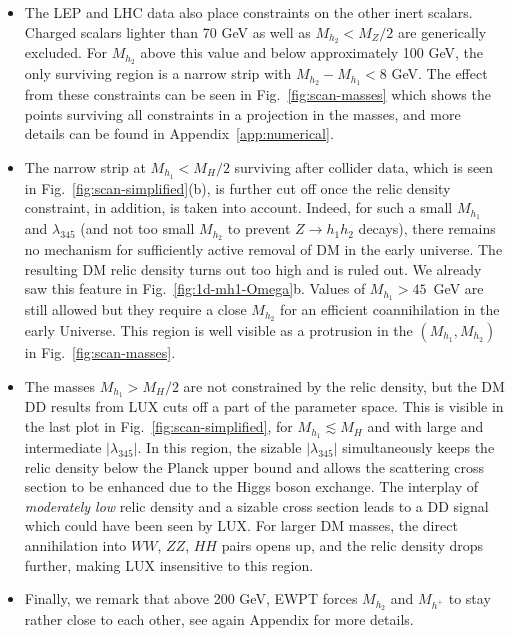 \documentclass[12pt,a4paper]{article}
\begin{document}
\begin{itemize}
\item 
The LEP and LHC data also place constraints on the other inert scalars. 
Charged scalars lighter than 70 GeV as well as $M_{h_2} < M_Z/2$ are generically excluded. 
For $M_{h_2}$ above this value and below approximately 100 GeV, 
the only surviving region is a narrow strip with $M_{h_2} - M_{h_1} < 8$ GeV.
The effect from these constraints can be seen in Fig.~\ref{fig:scan-masses} which shows the points surviving all constraints in a projection in the masses, and more details can be found in Appendix~\ref{app:numerical}.

\item The narrow strip at $M_{h_1}<M_H/2$ surviving after collider data,
which is seen in Fig.~\ref{fig:scan-simplified}(b),
is further cut off once the relic density constraint, in addition,
is taken into account. Indeed, for such a small $M_{h_1}$ and $\lambda_{345}$
(and not too small $M_{h_2}$ to prevent $Z \to h_1 h_2$ decays), 
there remains no mechanism for sufficiently active removal of DM 
in the early universe. The resulting DM relic density turns out too high and is ruled out. We already saw this feature 
in Fig.~\ref{fig:1d-mh1-Omega}b. Values of $M_{h_1} > 45$~GeV are still allowed but they require
a close $M_{h_2}$ for an efficient coannihilation in the early Universe.
This region is well visible as a protrusion in the $(M_{h_1},M_{h_2})$ in Fig.~\ref{fig:scan-masses}.

\item The masses $M_{h_1} > M_H/2$ are not constrained by the relic density,
but the DM DD results from LUX cuts off a part of the parameter space.
This is visible in the last plot in Fig.~\ref{fig:scan-simplified},
for $M_{h_1}\lesssim M_H$ and with large and intermediate $|\lambda_{345}|$.
In this region, the sizable $|\lambda_{345}|$ simultaneously keeps the relic density below the Planck upper bound
and allows the scattering cross section to be enhanced due to the Higgs boson exchange.
The interplay of {\em moderately low} relic density and a sizable cross section leads to a DD signal
which could have been seen by LUX.
For larger DM masses, the direct annihilation into $WW$, $ZZ$, $HH$ pairs opens up,
and the relic density drops further, making LUX insensitive to this region.

\item Finally, we remark that above 200 GeV, EWPT forces $M_{h_2}$ and $M_{h^{+}}$ to stay rather close
to each other, see again Appendix for more details.

\end{itemize}
\end{document}
